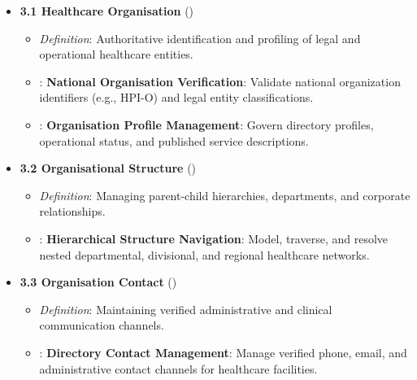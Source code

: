 \begin{itemize}

\item 
\textbf{3.1 Healthcare Organisation} (\texttt{})


\begin{itemize}

\item 
\emph{Definition}: Authoritative identification and profiling of legal and operational healthcare entities.



\item 
\texttt{}: \textbf{National Organisation Verification}: Validate national organization identifiers (e.g., HPI-O) and legal entity classifications.



\item 
\texttt{}: \textbf{Organisation Profile Management}: Govern directory profiles, operational status, and published service descriptions.



\end{itemize}


\item 
\textbf{3.2 Organisational Structure} (\texttt{})


\begin{itemize}

\item 
\emph{Definition}: Managing parent-child hierarchies, departments, and corporate relationships.



\item 
\texttt{}: \textbf{Hierarchical Structure Navigation}: Model, traverse, and resolve nested departmental, divisional, and regional healthcare networks.



\end{itemize}


\item 
\textbf{3.3 Organisation Contact} (\texttt{})


\begin{itemize}

\item 
\emph{Definition}: Maintaining verified administrative and clinical communication channels.



\item 
\texttt{}: \textbf{Directory Contact Management}: Manage verified phone, email, and administrative contact channels for healthcare facilities.



\end{itemize}


\end{itemize}
\label{rad:enabling:174}
